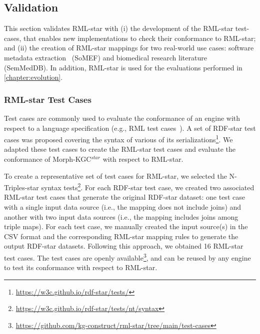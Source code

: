 \subsection{Validation}
\label{sec:chp4_validation}

This section validates RML-star with (i) the development of the RML-star test-cases, that enables new implementations to check their conformance to RML-star; and (ii) the creation of RML-star mappings for two real-world use cases: software metadata extraction~\parencite{kelley2021framework} (SoMEF) and biomedical research literature~\parencite{SemMedDB} (SemMedDB). In addition, RML-star is used for the evaluations performed in \cref{chapter:evolution}.




\subsubsection{RML-star Test Cases}
\label{sec:chp4_star_testcases}

Test cases are commonly used %
to evaluate the conformance of an engine with respect to a language specification (e.g., RML test cases~\parencite{heyvaert2019conformance}). 
A set of \mbox{RDF-star} test cases was proposed
covering the syntax of various of its serializations\footnote{\url{https://w3c.github.io/rdf-star/tests/}}.
We adapted these test cases to create the RML-star test cases and evaluate the conformance of \mbox{Morph-KGC$^{star}$}
with respect to \mbox{RML-star}.

To create a representative set of test cases for \mbox{RML-star}, we selected the N-Triples-star syntax tests\footnote{\url{https://w3c.github.io/rdf-star/tests/nt/syntax}}.  %
For each \mbox{RDF-star} test case, we created two associated \mbox{RML-star} test cases that generate the original \mbox{RDF-star} dataset: one test case with a single input data source (i.e., the mapping does not include joins) and another with two input data sources (i.e., the mapping includes joins among triple maps).
For each test case, we manually created the input source(s) in the CSV format and the corresponding \mbox{RML-star} mapping rules to generate the output \mbox{RDF-star} datasets.
Following this approach, we obtained 16 \mbox{RML-star} test cases.
The test cases are openly available\footnote{\url{https://github.com/kg-construct/rml-star/tree/main/test-cases}},
and can be reused by any engine to test its conformance with respect to \mbox{RML-star}.


